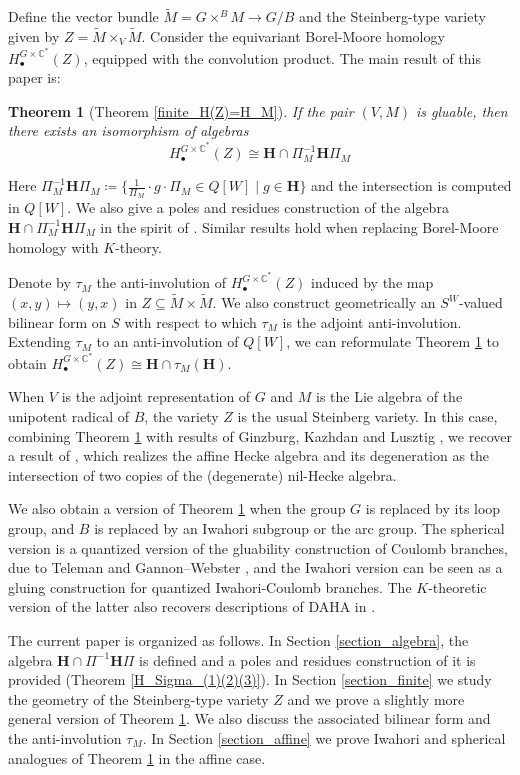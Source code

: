 \documentclass[11pt]{article}
\newcommand{\C}{\mathbb{C}}
\renewcommand{\H}{\textbf{H}}
\newcommand{\1}{\mathbb{1}}
\newcommand{\HBM}[2]{H_\bullet^{#1}(#2)}
\newcommand{\tM}{\widetilde{M}}
\renewcommand{\subset}{\subseteq}
\newtheorem{theorem}{Theorem}[section]
\theoremstyle{definition}
\numberwithin{equation}{section}
\begin{document}
Define the vector bundle $\tM = G\times^B M \rightarrow G/B$ and the Steinberg-type variety given by $Z = \tM \times_V \tM$. Consider the equivariant Borel-Moore homology $\HBM{G\times \C^*}{Z}$, equipped with the convolution product. The main result of this paper is:

\begin{theorem}[Theorem \ref{finite_H(Z)=H_M}]
\label{intro_theorem}
If the pair $(V,M)$ is gluable, then there exists an isomorphism of algebras
    $$\HBM{G\times \C^*}{Z} \cong \H \cap \Pi_M^{-1} \H \Pi_M$$
\end{theorem}

Here $\Pi_M^{-1}  \H \Pi_M \coloneqq \{ \frac{1}{\Pi_M} \cdot g \cdot \Pi_M \in Q[W]  \mid g \in \H\}$ and the intersection is computed in $Q[W]$. We also give a poles and residues construction of the algebra $\H \cap \Pi_M^{-1}  \H \Pi_M$ in the spirit of \cite{GKV}. Similar results hold when replacing Borel-Moore homology with $K$-theory.

Denote by $\tau_M$ the anti-involution of $\HBM{G\times \C^*}{Z}$ induced by the map $(x,y)\mapsto (y,x)$ in $Z\subset \tM \times \tM$. We also construct geometrically an $S^W$-valued bilinear form on $S$ with respect to which $\tau_M$ is the adjoint anti-involution. Extending $\tau_M$ to an anti-involution of $Q[W]$, we can reformulate Theorem \ref{intro_theorem} to obtain $\HBM{G\times \C^*}{Z} \cong \H \cap \tau_M(\H)$. 

When $V$ is the adjoint representation of $G$ and $M$ is the Lie algebra of the unipotent radical of $B$, the variety $Z$ is the usual Steinberg variety. In this case, combining Theorem \ref{intro_theorem} with results of Ginzburg, Kazhdan and Lusztig \cite{KL, Gi2, Lu}, we recover a result of \cite{GKV}, which realizes the affine Hecke algebra and its degeneration as the intersection of two copies of the (degenerate) nil-Hecke algebra.

We also obtain a version of Theorem \ref{intro_theorem} when the group $G$ is replaced by its loop group, and $B$ is replaced by an Iwahori subgroup or the arc group. The spherical version is a quantized version of the gluability construction of Coulomb branches, due to Teleman and Gannon--Webster \cite{Tel, GW}, and the Iwahori version can be seen as a gluing construction for quantized Iwahori-Coulomb branches. The $K$-theoretic version of the latter also recovers descriptions of DAHA in \cite{GKV, BEG}.

The current paper is organized as follows. In Section \ref{section_algebra}, the algebra $\H \cap \Pi^{-1} \H \Pi$ is defined and a poles and residues construction of it is provided (Theorem \ref{H_Sigma_(1)(2)(3)}). In Section \ref{section_finite} we study the geometry of the Steinberg-type variety $Z$ and we prove a slightly more general version of Theorem \ref{intro_theorem}. We also discuss the associated bilinear form and the anti-involution $\tau_M$. In Section \ref{section_affine} we prove Iwahori and spherical analogues of Theorem \ref{intro_theorem} in the affine case.
\end{document}
